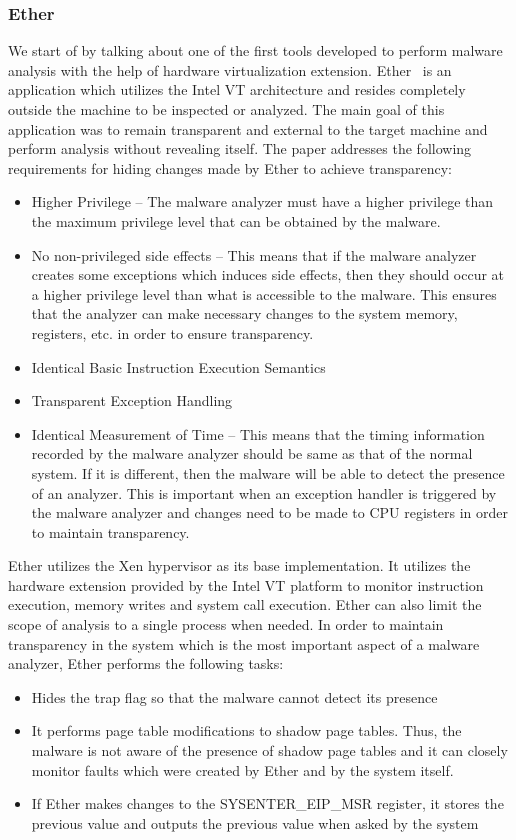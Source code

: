 \documentclass[11pt]{article}
\begin{document}
	\subsubsection{Ether}
	We start of by talking about one of the first tools developed to perform malware analysis with the help of hardware virtualization extension. Ether~\cite{dinaburg2008ether} is an application which utilizes the Intel VT architecture and resides completely outside the machine to be inspected or analyzed. The main goal of this application was to remain transparent and external to the target machine and perform analysis without revealing itself. The paper addresses the following requirements for hiding changes made by Ether to achieve transparency:
	\begin{itemize}
		\item Higher Privilege – The malware analyzer must have a higher privilege than the maximum privilege level that can be obtained by the malware. 
		\item No non-privileged side effects – This means that if the malware analyzer creates some exceptions which induces side effects, then they should occur at a higher privilege level than what is accessible to the malware. This ensures that the analyzer can make necessary changes to the system memory, registers, etc. in order to ensure transparency.
		\item Identical Basic Instruction Execution Semantics
		\item Transparent Exception Handling
		\item Identical Measurement of Time – This means that the timing information recorded by the malware analyzer should be same as that of the normal system. If it is different, then the malware will be able to detect the presence of an analyzer. This is important when an exception handler is triggered by the malware analyzer and changes need to be made to CPU registers in order to maintain transparency.
	\end{itemize}
	Ether utilizes the Xen hypervisor as its base implementation. It utilizes the hardware extension provided by the Intel VT platform to monitor instruction execution, memory writes and system call execution. Ether can also limit the scope of analysis to a single process when needed. In order to maintain transparency in the system which is the most important aspect of a malware analyzer, Ether performs the following tasks:
	\begin{itemize}
		\item Hides the trap flag so that the malware cannot detect its presence
		\item It performs page table modifications to shadow page tables. Thus, the malware is not aware of the presence of shadow page tables and it can closely monitor faults which were created by Ether and by the system itself.
		\item If Ether makes changes to the SYSENTER\_EIP\_MSR register, it stores the previous value and outputs the previous value when asked by the system
	\end{itemize}
\end{document}
